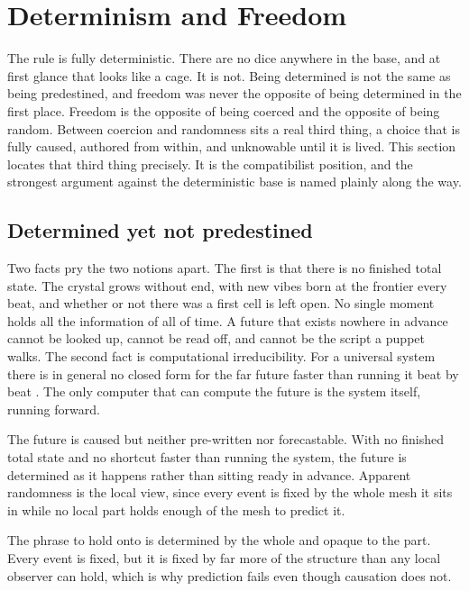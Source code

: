 \section{Determinism and Freedom}

The rule is fully deterministic. There are no dice anywhere in the base, and at first glance that looks like a
cage. It is not. Being determined is not the same as being predestined, and freedom was never the opposite of
being determined in the first place. Freedom is the opposite of being coerced and the opposite of being random.
Between coercion and randomness sits a real third thing, a choice that is fully caused, authored from within, and
unknowable until it is lived. This section locates that third thing precisely. It is the compatibilist position,
and the strongest argument against the deterministic base is named plainly along the way.

\subsection{Determined yet not predestined}

Two facts pry the two notions apart. The first is that there is no finished total state. The crystal grows without
end, with new vibes born at the frontier every beat, and whether or not there was a first cell is left open. No
single moment holds all the information of all of time. A future that exists nowhere in advance cannot be looked
up, cannot be read off, and cannot be the script a puppet walks. The second fact is computational
irreducibility. For a universal system there is in general no closed form for the far future faster than running it
beat by beat \cite{margenstern2013}. The only computer that can compute the future is the system itself, running
forward.

\begin{principle}
The future is caused but neither pre-written nor forecastable. With no finished total state and no shortcut faster
than running the system, the future is determined as it happens rather than sitting ready in advance. Apparent
randomness is the local view, since every event is fixed by the whole mesh it sits in while no local part holds
enough of the mesh to predict it.
\end{principle}

The phrase to hold onto is determined by the whole and opaque to the part. Every event is fixed, but it is fixed
by far more of the structure than any local observer can hold, which is why prediction fails even though
causation does not.

